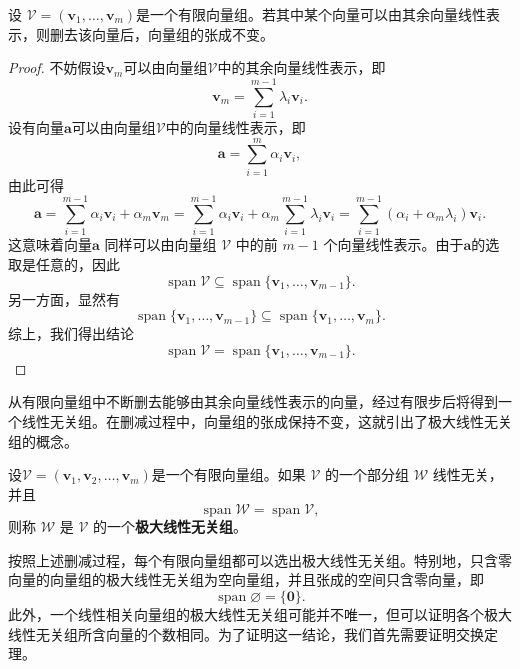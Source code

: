 \begin{proposition}
    设 \(\mathcal{V}=(\bm v_1,\ldots,\bm v_m) \)是一个有限向量组。若其中某个向量可以由其余向量线性表示，则删去该向量后，向量组的张成不变。
\end{proposition}
\begin{proof}
    不妨假设\( \bm{v}_m \)可以由向量组\( \mathcal{V} \)中的其余向量线性表示，即
    \[
        \bm{v}_m = \sum_{i=1}^{m-1} \lambda_i \bm{v}_i.
    \]
    设有向量\( \bm{a} \)可以由向量组\( \mathcal{V} \)中的向量线性表示，即
    \[
        \bm{a} = \sum_{i=1}^{m} \alpha_i \bm{v}_i,
    \]
    由此可得
    \[
        \bm{a} = \sum_{i=1}^{m-1} \alpha_i \bm{v}_i + \alpha_m \bm{v}_m
        = \sum_{i=1}^{m-1} \alpha_i \bm{v}_i + \alpha_m \sum_{i=1}^{m-1} \lambda_i \bm{v}_i
        = \sum_{i=1}^{m-1} (\alpha_i + \alpha_m \lambda_i) \bm{v}_i.
    \]
    这意味着向量\( \bm{a} \) 同样可以由向量组 \( \mathcal{V} \) 中的前 \( m-1 \) 个向量线性表示。由于\( \bm{a} \)的选取是任意的，因此
    \[
        \operatorname{span}\mathcal{V} \subseteq  \operatorname{span}\{\bm v_1,\ldots,\bm v_{m-1}\}.
    \]
    另一方面，显然有
    \[
        \operatorname{span}\{\bm v_1,\ldots,\bm v_{m-1}\} \subseteq \operatorname{span}\{\bm v_1,\ldots,\bm v_m\}.
    \]
    综上，我们得出结论
    \[
        \operatorname{span}\mathcal{V} =  \operatorname{span}\{\bm v_1,\ldots,\bm v_{m-1}\}.
    \]
\end{proof}

从有限向量组中不断删去能够由其余向量线性表示的向量，经过有限步后将得到一个线性无关组。在删减过程中，向量组的张成保持不变，这就引出了极大线性无关组的概念。

\begin{definition}[极大线性无关组]
    \label{def_maximal_independent}
    设\( \mathcal V=(\bm v_1,\bm v_2,\ldots,\bm v_m) \)是一个有限向量组。如果 \(\mathcal V\) 的一个部分组 \(\mathcal W\) 线性无关，并且
    \[
        \operatorname{span}\mathcal W
        =\operatorname{span}\mathcal V,
    \]
    则称 \(\mathcal W\) 是 \(\mathcal V\) 的一个\textbf{极大线性无关组}。
\end{definition}

按照上述删减过程，每个有限向量组都可以选出极大线性无关组。特别地，只含零向量的向量组的极大线性无关组为空向量组，并且张成的空间只含零向量，即
\[
    \operatorname{span}\varnothing=\{\bm 0\}.
\]
此外，一个线性相关向量组的极大线性无关组可能并不唯一，但可以证明各个极大线性无关组所含向量的个数相同。为了证明这一结论，我们首先需要证明交换定理。

